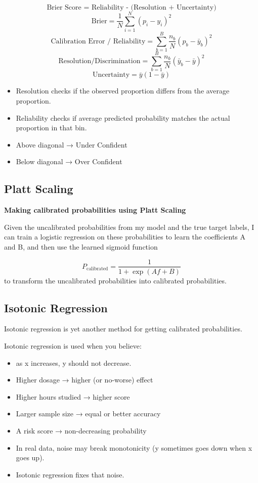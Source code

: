 \documentclass[10pt,a4paper]{article}
\begin{document}
	$$	\text{Brier Score = Reliability - (Resolution + Uncertainty)}
	$$
	$$	\text{Brier} = \frac{1}{N} \sum_{i=1}^{N} (p_i - y_i)^2
	$$
	$$	\text{Calibration Error / Reliability} =  \sum_{b=1}^{B} \frac{n_b}{N} (p_b - \bar{y}_b)^2
	$$
	$$	\text{Resolution/Discrimination} =  \sum_{b=1}^{B} \frac{n_b}{N} ( \bar{y}_b - \bar{y})^2
	$$
	$$	\text{Uncertainty} = \bar{y} ( 1- \bar{y})
	$$
	\begin{itemize}
		\item Resolution checks if the observed proportion differs from the average proportion.
		\item Reliability checks if average predicted probability matches the actual proportion in that bin.
	\end{itemize}

	\begin{itemize}
		\item Above diagonal → Under Confident
		\item Below diagonal → Over Confident
	\end{itemize}


	\subsection{Platt Scaling}
	\textbf{Making calibrated probabilities using Platt Scaling}

	Given the uncalibrated probabilities from my model and the true target labels, I can train a logistic regression on these probabilities to learn the coefficients A and B, and then use the learned sigmoid function

	$$	P_{\text{calibrated}} = \frac{1}{1+\exp{(Af+B)}}
	$$
	to transform the uncalibrated probabilities into calibrated probabilities.

	\subsection{Isotonic Regression}
	Isotonic regression is yet another method for getting calibrated probabilities.

	Isotonic regression is used when you believe:
	\begin{itemize}
		\item as x increases, y should not decrease.
		\item Higher dosage → higher (or no-worse) effect
		\item Higher hours studied → higher score
		\item Larger sample size → equal or better accuracy
		\item A risk score → non-decreasing probability
		\item In real data, noise may break monotonicity (y sometimes goes down when x goes up).
		\item Isotonic regression fixes that noise.
	\end{itemize}
\end{document}
